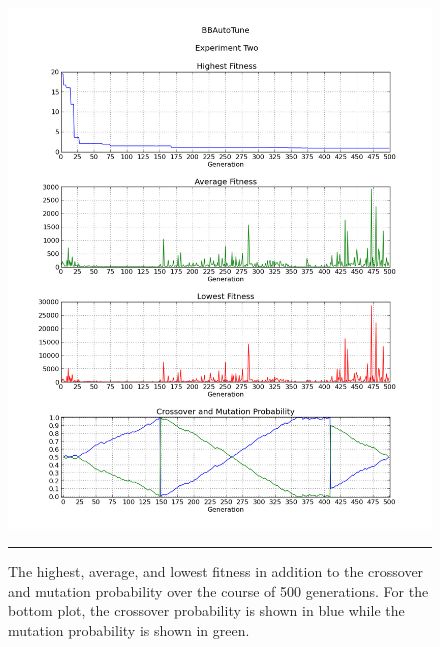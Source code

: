 \begin{figure}[htbp]
\centering
\includegraphics[width=5in]{../Figures/Chapter4/exp2_halcm.png}
\rule{35em}{0.5pt}
\caption[Experiment Two GA Metrics]{The highest, average, and lowest fitness in addition to the crossover and mutation probability over the course of 500 generations. For the bottom plot, the crossover probability is shown in blue while the mutation probability is shown in green.}
\label{fig:exp2_halcm}
\end{figure}

